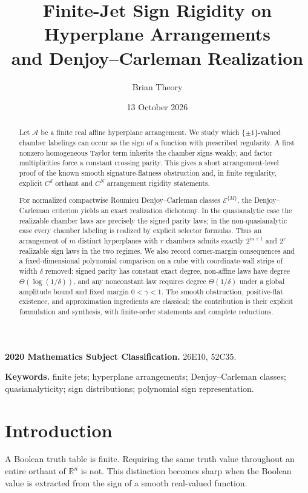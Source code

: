 \documentclass[11pt]{article}
\title{\vspace{-1.2cm}\textbf{Finite-Jet Sign Rigidity on Hyperplane Arrangements\\and Denjoy--Carleman Realization}}
\author{Brian Theory}
\date{13 October 2026}
\theoremstyle{definition}
\theoremstyle{remark}
\newcommand{\R}{\mathbb{R}}
\begin{document}
\maketitle

\begin{abstract}
Let $\mathcal A$ be a finite real affine hyperplane arrangement. We study which $\{\pm1\}$-valued chamber labelings can occur as the sign of a function with prescribed regularity. A first nonzero homogeneous Taylor term inherits the chamber signs weakly, and factor multiplicities force a constant crossing parity. This gives a short arrangement-level proof of the known smooth signature-flatness obstruction and, in finite regularity, explicit $C^d$ orthant and $C^N$ arrangement rigidity statements.

For normalized compactwise Roumieu Denjoy--Carleman classes $\mathcal E^{\{M\}}$, the Denjoy--Carleman criterion yields an exact realization dichotomy. In the quasianalytic case the realizable chamber laws are precisely the signed parity laws; in the non-quasianalytic case every chamber labeling is realized by explicit selector formulas. Thus an arrangement of $m$ distinct hyperplanes with $r$ chambers admits exactly $2^{m+1}$ and $2^r$ realizable sign laws in the two regimes. We also record corner-margin consequences and a fixed-dimensional polynomial comparison on a cube with coordinate-wall strips of width $\delta$ removed: signed parity has constant exact degree, non-affine laws have degree $\Theta(\log(1/\delta))$, and any nonconstant law requires degree $\Theta(1/\delta)$ under a global amplitude bound and fixed margin $0<\gamma<1$. The smooth obstruction, positive-flat existence, and approximation ingredients are classical; the contribution is their explicit formulation and synthesis, with finite-order statements and complete reductions.
\end{abstract}

\noindent\textbf{2020 Mathematics Subject Classification.} 26E10, 52C35.

\noindent\textbf{Keywords.} finite jets; hyperplane arrangements; Denjoy--Carleman classes; quasianalyticity; sign distributions; polynomial sign representation.

\section{Introduction}

A Boolean truth table is finite. Requiring the same truth value throughout an entire orthant of $\R^n$ is not. This distinction becomes sharp when the Boolean value is extracted from the sign of a smooth real-valued function.
\end{document}
